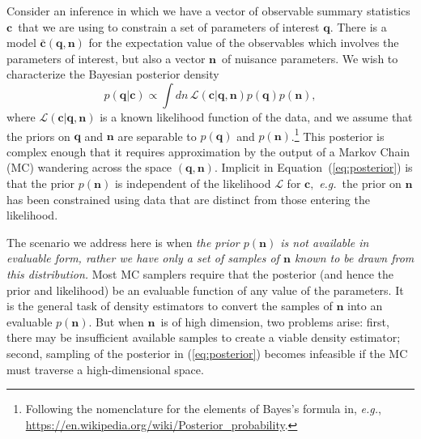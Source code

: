 \documentclass[onecolumn,resetfootnote]{aastex7}
\newcommand{\eg}{\textit{e.g.}}
\newcommand{\eqq}[1]{Equation~(\ref{#1})}
\newcommand{\vecc}{\ensuremath{\mathbf{c}}}
\newcommand{\vecq}{\ensuremath{\mathbf{q}}}
\newcommand{\vecn}{\ensuremath{\mathbf{n}}}
\newcommand{\hatc}{\ensuremath{\bar{\mathbf{c}}}}
\newcommand{\likeli}{\mathcal{L}}
\begin{document}
Consider an inference in which we have a vector of observable summary
statistics \vecc\ that we are using to constrain a set of parameters of
interest \vecq.  There is a model $\hatc(\vecq,\vecn)$ for the
expectation value of the observables which involves the parameters of interest, but also a
vector \vecn\ of nuisance parameters.  
We wish to characterize the Bayesian posterior density
\begin{equation}
  p(\vecq | \vecc) \propto \int dn\, \likeli(\vecc | \vecq, \vecn) p(\vecq) p(\vecn),
\label{eq:posterior}
\end{equation}
where $\likeli(\vecc | \vecq, \vecn)$ is a known likelihood function
of the data, and we assume that the priors on $\vecq$ and $\vecn$ are separable
to $p(\vecq)$ and $p(\vecn)$.\footnote{Following the nomenclature for the
elements of Bayes's formula in, \eg, \url{https://en.wikipedia.org/wiki/Posterior_probability}.}
This posterior is complex enough that it requires
approximation by the output of a Markov Chain (MC) wandering across the space $(\vecq,\vecn).$
Implicit in \eqq{eq:posterior} is that the prior $p(\vecn)$ is independent of
  the likelihood $\likeli$ for $\vecc,$ \eg\ the prior on $\vecn$ has been constrained using
  data that are distinct from those entering the likelihood.

The scenario we address here is when \emph{the prior $p(\vecn)$ is not
    available in evaluable form, rather we have only
  a set of samples of $\vecn$ known to be drawn from this
  distribution.} Most MC samplers require that the posterior (and
hence the prior and likelihood) be an
evaluable function of any value of the parameters. It is the general task of density estimators to convert the samples of $\vecn$ into an evaluable $p(\vecn).$  But when \vecn\ is of high dimension, two problems arise: first, there may be insufficient available samples to create a viable density estimator; second, sampling of the posterior in (\ref{eq:posterior}) becomes infeasible if the MC must traverse a high-dimensional space.
\end{document}
